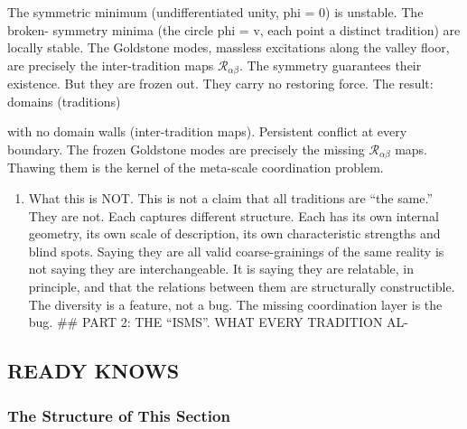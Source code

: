 \documentclass[
]{article}
\providecommand{\tightlist}{%
  \setlength{\itemsep}{0pt}\setlength{\parskip}{0pt}}
\begin{document}
The symmetric minimum (undifferentiated unity, phi = 0) is unstable. The
broken- symmetry minima (the circle \textbar phi\textbar{} = v, each
point a distinct tradition) are locally stable. The Goldstone modes,
massless excitations along the valley floor, are precisely the
inter-tradition maps \(\mathcal{R}_{\alpha\beta}\). The symmetry
guarantees their existence. But they are frozen out. They carry no
restoring force. The result: domains (traditions)

with no domain walls (inter-tradition maps). Persistent conflict at
every boundary. The frozen Goldstone modes are precisely the missing
\(\mathcal{R}_{\alpha\beta}\) maps. Thawing them is the kernel of the
meta-scale coordination problem.

\begin{enumerate}
\def\labelenumi{\arabic{enumi}.}
\setcounter{enumi}{11}
\tightlist
\item
  What this is NOT. This is not a claim that all traditions are ``the
  same.'' They are not. Each captures different structure. Each has its
  own internal geometry, its own scale of description, its own
  characteristic strengths and blind spots. Saying they are all valid
  coarse-grainings of the same reality is not saying they are
  interchangeable. It is saying they are relatable, in principle, and
  that the relations between them are structurally constructible. The
  diversity is a feature, not a bug. The missing coordination layer is
  the bug. \#\# PART 2: THE ``ISMS''. WHAT EVERY TRADITION AL-
\end{enumerate}

\subsection{READY KNOWS}\label{ready-knows}

\subsubsection{The Structure of This
Section}\label{the-structure-of-this-section}
\end{document}
